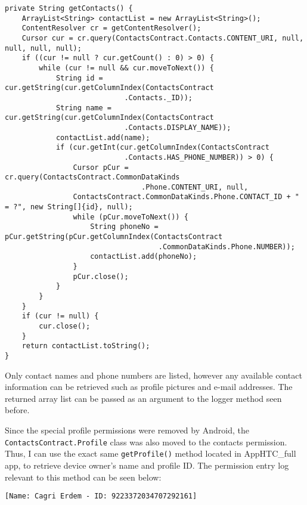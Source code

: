 \documentclass[
  a4paper,  %
  twoside,  %
  bibliography=totoc,
  headsepline,
  cleardoublepage=empty,
  parskip=half,
  draft=false,
  open=any
]{scrbook}
\begin{document}
\begin{lstlisting}
private String getContacts() {
	ArrayList<String> contactList = new ArrayList<String>();
	ContentResolver cr = getContentResolver();
	Cursor cur = cr.query(ContactsContract.Contacts.CONTENT_URI, null, null, null, null);
	if ((cur != null ? cur.getCount() : 0) > 0) {
		while (cur != null && cur.moveToNext()) {
			String id = cur.getString(cur.getColumnIndex(ContactsContract
							.Contacts._ID));
			String name = cur.getString(cur.getColumnIndex(ContactsContract
							.Contacts.DISPLAY_NAME));
			contactList.add(name);
			if (cur.getInt(cur.getColumnIndex(ContactsContract
							.Contacts.HAS_PHONE_NUMBER)) > 0) {
				Cursor pCur = cr.query(ContactsContract.CommonDataKinds
								.Phone.CONTENT_URI, null,
				ContactsContract.CommonDataKinds.Phone.CONTACT_ID + " = ?", new String[]{id}, null);
				while (pCur.moveToNext()) {
					String phoneNo = pCur.getString(pCur.getColumnIndex(ContactsContract
									.CommonDataKinds.Phone.NUMBER));
					contactList.add(phoneNo);
				}
				pCur.close();
			}
		}
	}
	if (cur != null) {
		cur.close();
	}
	return contactList.toString();
}
\end{lstlisting}
Only contact names and phone numbers are listed, however any available contact information can be retrieved such as profile pictures and e-mail addresses. The returned array list can be passed as an argument to the logger method seen before. 

Since the special profile permissions were removed by Android, the \texttt{ContactsContract.Profile} class was also moved to the contacts permission. Thus, I can use the exact same \texttt{getProfile()} method located in AppHTC\_full app, to retrieve device owner's name and profile ID. The permission entry log relevant to this method can be seen below:
\begin{lstlisting}
[Name: Cagri Erdem - ID: 9223372034707292161]
\end{lstlisting}
\end{document}
